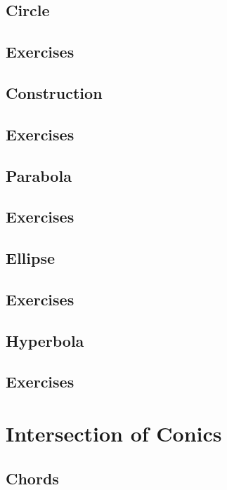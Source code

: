 \documentclass[journal,12pt,onecolumn]{IEEEtran}
\begin{document}
\subsection{Circle}

\subsection{Exercises}

\subsection{Construction}

\subsection{Exercises}

\subsection{Parabola}

\subsection{Exercises}

\subsection{Ellipse}

\subsection{Exercises}

\subsection{Hyperbola}

\subsection{Exercises}


\section{Intersection of Conics}
\subsection{Chords }

\end{document}
